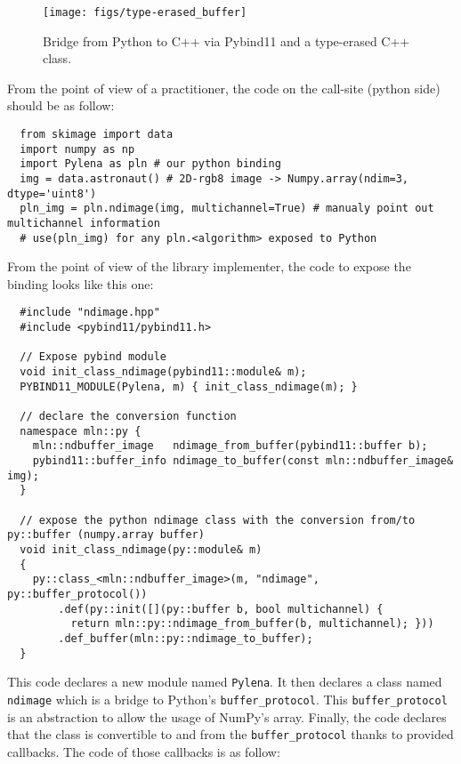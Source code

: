 \begin{figure}[tbh]
  \centering
  \texttt{[image: figs/type-erased\_buffer]}
  \caption{Bridge from Python to C++ via Pybind11 and a type-erased C++ class.}
  \label{fig:type-erased.buffer}
\end{figure}

From the point of view of a practitioner, the code on the call-site (python side) should be as follow:
\begin{verbatim}
  from skimage import data
  import numpy as np
  import Pylena as pln # our python binding
  img = data.astronaut() # 2D-rgb8 image -> Numpy.array(ndim=3, dtype='uint8')
  pln_img = pln.ndimage(img, multichannel=True) # manualy point out multichannel information
  # use(pln_img) for any pln.<algorithm> exposed to Python
\end{verbatim}

From the point of view of the library implementer, the code to expose the binding looks like this one:
\begin{verbatim}
  #include "ndimage.hpp"
  #include <pybind11/pybind11.h>

  // Expose pybind module
  void init_class_ndimage(pybind11::module& m);
  PYBIND11_MODULE(Pylena, m) { init_class_ndimage(m); }

  // declare the conversion function
  namespace mln::py {
    mln::ndbuffer_image   ndimage_from_buffer(pybind11::buffer b);
    pybind11::buffer_info ndimage_to_buffer(const mln::ndbuffer_image& img);
  }

  // expose the python ndimage class with the conversion from/to py::buffer (numpy.array buffer)
  void init_class_ndimage(py::module& m)
  {
    py::class_<mln::ndbuffer_image>(m, "ndimage", py::buffer_protocol())
        .def(py::init([](py::buffer b, bool multichannel) {
          return mln::py::ndimage_from_buffer(b, multichannel); }))
        .def_buffer(mln::py::ndimage_to_buffer);
  }
\end{verbatim}

This code declares a new module named \texttt{Pylena}. It then declares a class named \texttt{ndimage} which is a bridge
to Python's \texttt{buffer\_protocol}. This \texttt{buffer\_protocol} is an abstraction to allow the usage of NumPy's
array. Finally, the code declares that the class is convertible to and from the \texttt{buffer\_protocol} thanks to
provided callbacks. The code of those callbacks is as follow:

